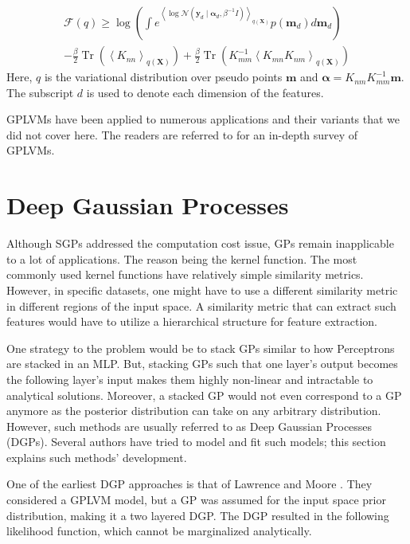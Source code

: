 \documentclass[letterpaper,11pt]{extarticle}
\begin{document}
$$
\begin{aligned}
\mathcal{F}(q) \geq \log \left(\int e^{\left\langle\log \mathcal{N}\left(\mathbf{y}_{d} \mid \boldsymbol{\alpha}_{d}, \beta^{-1} I\right)\right\rangle_{q(\mathbf{X})}}p\left(\mathbf{m}_{d}\right) d \mathbf{m}_{d}\right) \\
-\frac{\beta}{2} \operatorname{Tr}\left(\left\langle K_{nn}\right\rangle_{q(\mathbf{X})}\right)+\frac{\beta}{2} \operatorname{Tr}\left(K_{mm}^{-1}\left\langle K_{mn} K_{nm}\right\rangle_{q(\mathbf{X})}\right)
\end{aligned}
$$
Here, $q$ is the variational distribution over pseudo points $\mathbf{m}$ and $\mathbf{\alpha} = K_{nm}K^{-1}_{mm}\mathbf{m}$. The subscript $d$ is used to denote each dimension of the features.  

GPLVMs have been applied to numerous applications and their variants that we did not cover here. The readers are referred to \cite{LiC16} for an in-depth survey of GPLVMs. 

\section{Deep Gaussian Processes}
Although SGPs addressed the computation cost issue, GPs remain inapplicable to a lot of applications. The reason being the kernel function. The most commonly used kernel functions have relatively simple similarity metrics. However, in specific datasets, one might have to use a different similarity metric in different regions of the input space. A similarity metric that can extract such features would have to utilize a hierarchical structure for feature extraction. 

One strategy to the problem would be to stack GPs similar to how Perceptrons are stacked in an MLP. But, stacking GPs such that one layer's output becomes the following layer's input makes them highly non-linear and intractable to analytical solutions. Moreover, a stacked GP would not even correspond to a GP anymore as the posterior distribution can take on any arbitrary distribution. However, such methods are usually referred to as Deep Gaussian Processes (DGPs). Several authors have tried to model and fit such models; this section explains such methods' development. 

One of the earliest DGP approaches is that of Lawrence and Moore \cite{LawrenceM07}. They considered a GPLVM model, but a GP was assumed for the input space prior distribution, making it a two layered DGP. The DGP resulted in the following likelihood function, which cannot be marginalized analytically. 
\end{document}
